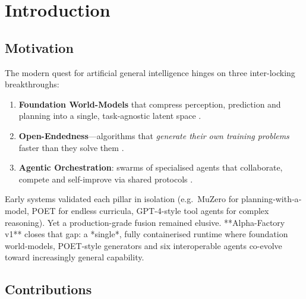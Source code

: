 \tableofcontents
\newpage

\section{Introduction}\label{sec:intro}

\subsection{Motivation}

The modern quest for artificial general intelligence hinges on three
inter-locking breakthroughs:

\begin{enumerate}[label=\textbf{P\arabic*}.]
  \item \textbf{Foundation World-Models} that compress perception, prediction
        and planning into a single, task-agnostic latent space
        \parencite{ha2018world,schrittwieser2019muzero,hafner2023dreamer}.
  \item \textbf{Open-Endedness}---algorithms that \emph{generate their own
        training problems} faster than they solve them
        \parencite{wang2019poet,clune2019aiga,ecoffet2021open}.
  \item \textbf{Agentic Orchestration}: swarms of specialised agents that
        collaborate, compete and self-improve via shared protocols
        \parencite{openaiagents2024,googleadk2024,a2a2023}.
\end{enumerate}

Early systems validated each pillar in isolation (e.g.\ MuZero for
planning‐with‐a‐model, POET for endless curricula, GPT-4-style tool agents for
complex reasoning).  Yet a production-grade fusion remained elusive.  
**Alpha-Factory v1** closes that gap: a *single*, fully containerised runtime
where foundation world-models, POET-style generators and six interoperable
agents co-evolve toward increasingly general capability.

\subsection{Contributions}

